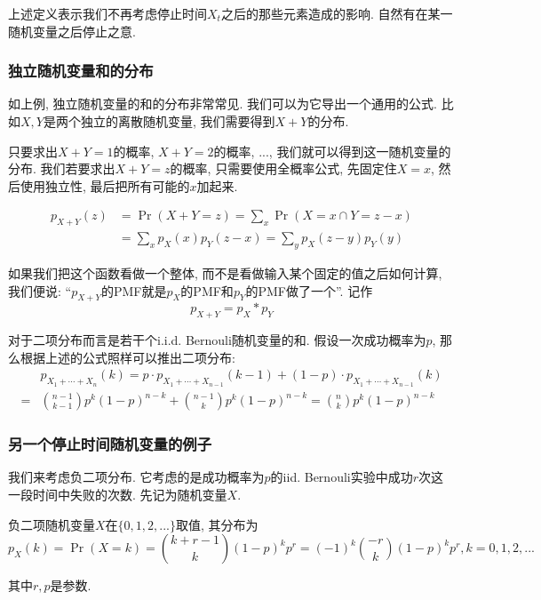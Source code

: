 \documentclass{ctexart}
\begin{document}
上述定义表示我们不再考虑停止时间$X_t$之后的那些元素造成的影响. 自然有在某一随机变量之后停止之意. 

\subsubsection{独立随机变量和的分布} 如上例, 独立随机变量的和的分布非常常见. 我们可以为它导出一个通用的公式. 比如$X, Y$是两个独立的离散随机变量, 我们需要得到$X+Y$的分布. 

只要求出$X+Y=1$的概率, $X+Y=2$的概率, ..., 我们就可以得到这一随机变量的分布. 我们若要求出$X+Y=z$的概率, 只需要使用全概率公式, 先固定住$X=x$, 然后使用独立性, 最后把所有可能的$x$加起来.  

$$
\begin{aligned}
 p_{X+Y}(z)&=\operatorname{Pr}(X+Y=z)=\sum_x \operatorname{Pr}(X=x \cap Y=z-x) \\
& =\sum_x p_X(x) p_Y(z-x)=\sum_y p_X(z-y) p_Y(y)
\end{aligned}
$$

如果我们把这个函数看做一个整体, 而不是看做输入某个固定的值之后如何计算, 我们便说: ``$p_{X+Y}$的PMF就是$p_X$的PMF和$p_Y$的PMF做了一个''. 记作
$$
p_{X+Y}=p_X * p_Y
$$

\begin{example}
    对于二项分布而言是若干个i.i.d. Bernouli随机变量的和. 假设一次成功概率为$p$, 那么根据上述的公式照样可以推出二项分布: 
    $$
\begin{aligned}
& p_{X_1+\cdots+X_n}(k)=p \cdot p_{X_1+\cdots+X_{n-1}}(k-1)+(1-p) \cdot p_{X_1+\cdots+X_{n-1}}(k) \\
= & \binom{n-1}{k-1} p^k(1-p)^{n-k}+\binom{n-1}{k} p^k(1-p)^{n-k}=\binom{n}{k} p^k(1-p)^{n-k}
\end{aligned}
$$
\end{example}


\subsubsection{另一个停止时间随机变量的例子} 我们来考虑负二项分布. 它考虑的是成功概率为$p$的iid. Bernouli实验中成功$r$次这一段时间中失败的次数. 先记为随机变量$X$. 

\begin{definition}[负二项分布]
    负二项随机变量$X$在$\{ 0,1,2 ,... \}$取值, 其分布为
    $$
p_X(k)=\operatorname{Pr}(X=k)=\binom{k+r-1}{k}(1-p)^k p^r=(-1)^k\binom{-r}{k}(1-p)^k p^r, k=0,1,2, ...
$$

其中$r, p$是参数. 
\end{definition}
\end{document}
